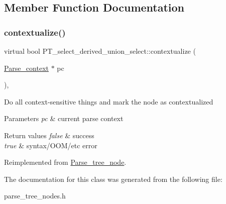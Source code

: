 \subsection{Member Function Documentation}
\mbox{\label{classPT__select__derived__union__select_aae12aee546f84a98e4cd95c8e98092d7}} 
\subsubsection{\texorpdfstring{contextualize()}{contextualize()}}
{\footnotesize\ttfamily virtual bool P\+T\+\_\+select\+\_\+derived\+\_\+union\+\_\+select\+::contextualize (\begin{DoxyParamCaption}\item[{\mbox{\hyperlink{structParse__context}{Parse\+\_\+context}} $\ast$}]{pc }\end{DoxyParamCaption})\hspace{0.3cm}{\ttfamily [inline]}, {\ttfamily [virtual]}}

Do all context-\/sensitive things and mark the node as contextualized


\begin{DoxyParams}{Parameters}
{\em pc} & current parse context\\
\hline
\end{DoxyParams}

\begin{DoxyRetVals}{Return values}
{\em false} & success \\
\hline
{\em true} & syntax/\+O\+O\+M/etc error \\
\hline
\end{DoxyRetVals}


Reimplemented from \mbox{\hyperlink{classParse__tree__node_a22d93524a537d0df652d7efa144f23da}{Parse\+\_\+tree\+\_\+node}}.



The documentation for this class was generated from the following file\+:\begin{DoxyCompactItemize}
\item 
parse\+\_\+tree\+\_\+nodes.\+h\end{DoxyCompactItemize}
